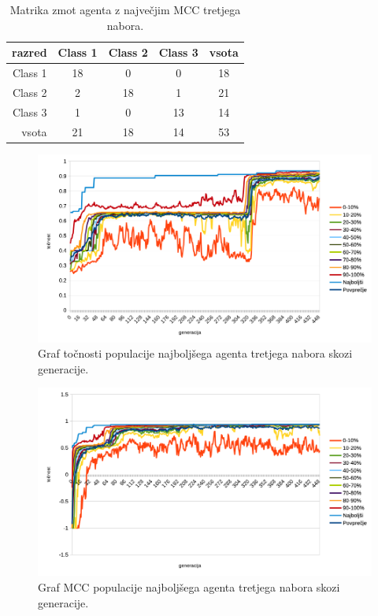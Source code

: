 \begin{table}[H]
    \centering
    \begin{tabular}{||rcccc||}
        \hline
        razred  & Class 1 & Class 2 & Class 3 & vsota \\ \hline
        Class 1 & 18      & 0       & 0       & 18    \\ \hline
        Class 2 & 2       & 18      & 1       & 21    \\ \hline
        Class 3 & 1       & 0       & 13      & 14    \\ \hline
        vsota   & 21      & 18      & 14      & 53    \\ \hline
    \end{tabular}
    \caption{Matrika zmot agenta z največjim MCC tretjega nabora.}
    \label{tab:wine_mcc_3}
\end{table}

\begin{figure}[H]
    \begin{center}
        \includegraphics[width=13cm]{wine/3/acc}
    \end{center}
    \caption{Graf točnosti populacije najboljšega agenta tretjega nabora skozi generacije.}
    \label{fig:wine_acc_3}
\end{figure}

\begin{figure}[H]
    \begin{center}
        \includegraphics[width=13cm]{wine/3/mcc}
    \end{center}
    \caption{Graf MCC populacije najboljšega agenta tretjega nabora skozi generacije.}
    \label{fig:wine_mcc_3}
\end{figure}

